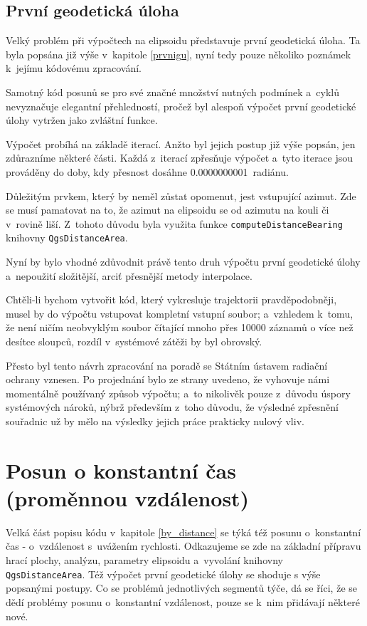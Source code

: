 \subsection{První geodetická úloha}
\label{prvniguplugin}

Velký problém při výpočtech na elipsoidu představuje první geodetická úloha. Ta byla popsána
již výše v~kapitole \ref{prvnigu}, nyní tedy pouze několiko poznámek k~jejímu kódovému zpracování. 

Samotný kód posunů se pro své značné množství nutných podmínek a~cyklů nevyznačuje
elegantní přehledností, pročež byl alespoň výpočet první geodetické úlohy vytržen jako zvláštní funkce.

Výpočet probíhá na základě iterací. Anžto byl jejich postup již výše popsán, jen zdůrazníme
některé části. Každá z~iterací zpřesňuje výpočet a~tyto iterace jsou prováděny do doby,
kdy přesnost dosáhne 0.0000000001~radiánu. 

Důležitým prvkem, který by neměl zůstat opomenut, jest vstupující azimut. Zde se musí pamatovat
na to, že azimut na elipsoidu se od azimutu na kouli či v~ro\-vině liší. Z~tohoto
důvodu byla využita funkce {\tt computeDistanceBearing} knihovny {\tt QgsDistanceArea}.

Nyní by bylo vhodné zdůvodnit právě tento druh výpočtu první geodetické úlohy a~nepoužití
složitější, arciť přesnější metody interpolace. 

Chtěli-li bychom vytvořit kód, který vykresluje trajektorii pravděpodobněji, mu\-sel by do
výpočtu vstupovat kompletní vstupní soubor; a~vzhledem k~tomu, že není ničím neobvyklým
soubor čítající mnoho přes 10000 záznamů o více než desítce sloupců, rozdíl v~systémové zátěži
by byl obrovský. 

Přesto byl tento návrh zpraco\-vá\-ní na poradě se Státním ústavem radiační ochra\-ny
vznesen. Po projednání bylo ze strany  uvedeno, že vyhovuje námi momentálně
používaný způsob výpočtu; a~to nikolivěk pouze z~důvodu úspory systémových nároků, nýbrž především
z~toho důvodu, že výsledné zpřesnění souřadnic už by mělo na výsledky jejich práce
prakticky nulový vliv. 

\section{Posun o konstantní čas (proměnnou vzdálenost)}
\label{by_seconds}

Velká část popisu kódu v~kapitole \ref{by_distance} se týká též posunu o~konstantní
čas - o~vzdále\-nost s~uvážením rychlosti. Odkazujeme se zde na základní přípravu hrací plochy,
analýzu, parametry elipsoidu a~vyvolání knihovny {\tt QgsDistanceArea}. Též výpočet první geodetické
úlohy se shoduje s výše popsanými postupy. Co se problémů jednotlivých
segmentů týče, dá se říci, že se dědí problémy posunu o~konstantní vzdálenost, pouze se k~nim
přidávají některé nové. 


